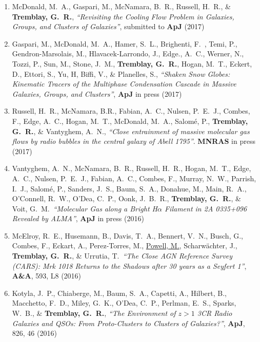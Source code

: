 \documentclass[11pt]{article}
\begin{document}
\begin{enumerate}[resume]

\item McDonald, M.~A., Gaspari, M., McNamara, B.~R., Russell, H.~R., \& \textbf{Tremblay, G.~R.}, \textit{``Revisiting the Cooling Flow Problem in Galaxies, Groups, and Clusters of Galaxies''}, submitted to \textbf{ApJ} (2017) 

\item Gaspari, M., McDonald, M.~A.,
Hamer, S.~L., Brighenti, F.~, Temi, P., Gendron-Marsolais, M., Hlavacek-Larrondo, J., Edge., A.~C., 
Werner, N., Tozzi, P., Sun, M., 
Stone, J.~M., \textbf{Tremblay, G.~R.}, Hogan, M.~T., Eckert, D., 
Ettori, S., Yu, H, Biffi, V., 
\& Planelles, S., \textit{``Shaken Snow Globes: Kinematic Tracers of the Multiphase Condensation
 Cascade in Massive Galaxies, Groups, and Clusters''}, \textbf{ApJ} in press (2017)

\item Russell, H.~R., McNamara, B.R., Fabian, A.~C., Nulsen, P.~E.~J., Combes, F., Edge, A.~C., Hogan, M.~T., McDonald, M.~A., Salom\'{e}, P., 
\textbf{Tremblay, G.~R.}, \& Vantyghem, A.~N., \textit{``Close entrainment of massive molecular gas flows by radio bubbles in the central galaxy of Abell 1795''}. \textbf{MNRAS} in press (2017)


\item Vantyghem, A.~N., McNamara, B.~R., 
Russell, H.~R., Hogan, M.~T., Edge, A.~C., 
Nulsen, P.~E.~J., Fabian, A.~C., Combes, F., 
Murray, N.~W., Parrish, I.~J., Salom\'{e}, P., 
Sanders, J.~S., Baum, S.~A., Donahue, M., 
Main, R.~A., O'Connell, R.~W., O'Dea, C.~P., 
Oonk, J.~B.~R., \textbf{Tremblay, G.~R.}, \& Voit, G.~M.\ {\it ``Molecular Gas along a Bright H$\alpha$ Filament in 2A 0335+096 Revealed by ALMA''}, \textbf{ApJ} in press (2016)

\item McElroy, R.~E., Husemann, B., 
Davis, T.~A., Bennert, V.~N., Busch, G., 
Combes, F., Eckart, A., Perez-Torres, 
M., \uline{Powell, M.}, Scharw\"{a}chter, J., {\bf Tremblay, G.~R.}, \& Urrutia, T.\ {\it ``The Close AGN Reference Survey (CARS): Mrk 1018 Returns to the Shadows after 30 years as a Seyfert 1''}, \textbf{A\&A}, 593, L8 (2016)


\item Kotyla, J.~P., Chiaberge, M., Baum, S.~A., Capetti, A., Hilbert, B., Macchetto, F.~D., Miley, G.~K., O'Dea, C.~P., Perlman, E.~S., Sparks, W.~B., \& {\bf Tremblay, G.~R.}, {\it ``The Environment of $z>1$ 3CR Radio Galaxies and QSOs: From Proto-Clusters to Clusters of Galaxies?''}, \textbf{ApJ}, 826, 46 (2016)



\end{enumerate}
\end{document}
